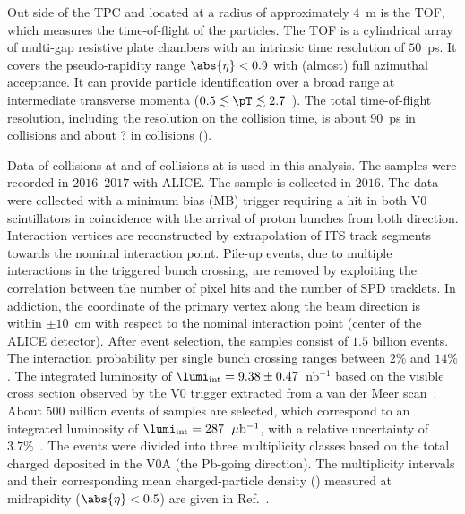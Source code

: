 Out side of the TPC and located at a radius of approximately $4$~m is the TOF, which measures the time-of-flight of the particles.
The TOF is a cylindrical array of multi-gap resistive plate chambers with an intrinsic time resolution of $50$~ps.
It covers the pseudo-rapidity range $\abs{\eta} < 0.9$ with (almost) full azimuthal acceptance.
It can provide particle identification over a broad range at intermediate transverse momenta ($0.5 \lesssim \pT \lesssim 2.7$~\GeVc).
The total time-of-flight resolution, including the resolution on the collision time, is about $90$~ps in \pp collisions and about ? in \pPb collisions ().

Data of \pp collisions at \thirteen and of \pPb collisions at \fivenn is used in this analysis.
The \pp samples were recorded in $2016$--$2017$ with ALICE.
The \pPb sample is collected in $2016$.
The data were collected with a minimum bias (MB) trigger requiring a hit in both V0 scintillators in coincidence with the arrival of proton bunches from both direction.
Interaction vertices are reconstructed by extrapolation of ITS track segments towards the nominal interaction point.
Pile-up events, due to multiple interactions in the triggered bunch crossing, are removed by exploiting the correlation between the number of pixel hits and the number of SPD tracklets.
In addiction, the coordinate of the primary vertex along the beam direction is within $\pm 10$~cm with respect to the nominal interaction point (center of the ALICE detector).
After event selection, the \pp samples consist of $1.5$ billion events.
The interaction probability per single bunch crossing ranges between $2\%$ and $14\%$.
The integrated luminosity of $\lumi_{\rm int} = 9.38\pm 0.47$~nb$^{-1}$ based on the visible cross section observed by the V0 trigger extracted from a van der Meer scan~\cite{ALICE-PUBLIC-2016-002}.
About $500$ million events of \pPb samples are selected, which correspond to an integrated luminosity of $\lumi_{\rm int} = 287$~$\mu{\rm b}^{-1}$, with a relative uncertainty of $3.7\%$~\cite{collaboration_2014}.
The \pPb events were divided into three multiplicity classes based on the total charged deposited in the V0A (the Pb-going direction).
The multiplicity intervals and their corresponding mean charged-particle density (\dndeta) measured at midrapidity ($\abs{\eta} < 0.5$) are given in Ref.~\cite{Adam:2015pza}.

